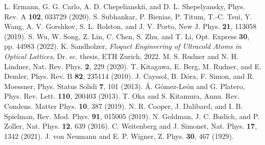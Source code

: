 \documentclass[reprint, amsmath, amssymb, aps]{revtex4-2}
\begin{document}
\begin{thebibliography}{9}
L. Ermann, G. G. Carlo, A. D. Chepelianskii, and D. L. Shepelyansky, Phys. Rev. A \textbf{102}, 033729 (2020).
S. Subhankar, P. Bienias, P. Titum, T.-C. Tsui, Y. Wang, A. V. Gorshkov, S. L. Rolston, and J. V. Porto, New J. Phys. \textbf{21}, 113058 (2019). 
S. Wu, W. Song, Z. Lin, C. Chen, S. Zhu, and T. Li, Opt. Express \textbf{30}, pp. 44983 (2022). 
K. Sandholzer, \textit{Floquet Engineering of Ultracold Atoms in Optical Lattices}, Dr. sc. thesis, ETH Zurich, 2022.
M. S. Rudner and N. H. Lindner, Nat. Rev. Phys. \textbf{2}, 229 (2020).
T. Kitagawa, E. Berg, M. Rudner, and E. Demler, Phys. Rev. B \textbf{82}, 235114 (2010).
J. Cayssol, B. Dóra, F. Simon, and R. Moessner, Phys. Status Solidi \textbf{7}, 101 (2013).
Á. Gómez-León and G. Platero, Phys. Rev. Lett. \textbf{110}, 200403 (2013).
T. Oka and S. Kitamura, Annu. Rev. Condens. Matter Phys. \textbf{10}, 387 (2019).
N. R. Cooper, J. Dalibard, and I. B. Spielman, Rev. Mod. Phys. \textbf{91}, 015005 (2019).
N. Goldman, J. C. Budich, and P. Zoller,  Nat. Phys. \textbf{12}, 639 (2016).
C. Weitenberg and J. Simonet, Nat. Phys. \textbf{17}, 1342 (2021).
J. von Neumann and E. P. Wigner, Z. Phys. \textbf{30}, 467 (1929).
\end{thebibliography}
\end{document}
